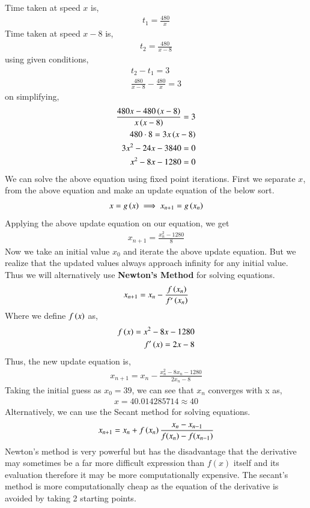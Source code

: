 \documentclass[journal]{IEEEtran}
\begin{document}
Time taken at speed $x$ is,
\begin{align}
    t_1 = \frac{480}{x}
\end{align}
Time taken at speed $x-8$ is,
\begin{align}
    t_2 = \frac{480}{x-8}
\end{align}
using given conditions,
\begin{align}
    t_2 - t_1 = 3\\
    \frac{480}{x-8} - \frac{480}{x} = 3
\end{align}
on simplifying,
\begin{align}
    \frac{480x - 480\left(x-8\right)}{x\left(x-8\right)} = 3\\
    480 \cdot 8 = 3x\left(x-8\right)\\
    3x^2 -24x -3840 = 0\\
    x^2 - 8x -1280 = 0
\end{align}
We can solve the above equation using fixed point iterations. First we separate $x$, from the above equation and make an update equation of the below sort.
\begin{align}
	x = g\left(x\right) \implies x_{n+1} = g\left(x_n\right)
\end{align}
Applying the above update equation on our equation, we get
\begin{align}
	x_{n+1} = 	\frac{x_n^2 - 1280}{8}
\end{align}
Now we take an initial value $x_0$ and iterate the above update equation. But we realize that the updated values always approach infinity for any initial value. \\
Thus we will alternatively use \textbf{Newton's Method} for solving equations.
\begin{align}
	x_{n+1} = x_n - \frac{f\left(x_n\right)}{f^{\prime}\left(x_n\right)} 
\end{align}
Where we define $f\left(x\right)$ as, 
\begin{align}
	f\left(x\right) = x^2-8x-1280 \\
	f^{\prime}\left(x\right) = 2x-8 
\end{align}
Thus, the new update equation is, 
\begin{align}
	x_{n+1} = x_n - \frac{x_n^2-8x_n-1280}{2x_n-8 } 
\end{align}
Taking the initial guess as $x_0 = 39$, we can see that $x_n$ converges with x as,
\begin{align}
	x = 40.014285714 \approx 40
\end{align}
Alternatively, we can use the Secant method for solving equations.
\begin{align}
	x_{n+1} = x_n + f\left(x_n\right)\frac{x_{n} -  x_{n-1}}{f(x_{n}) -  f(x_{n-1})}
\end{align}
Newton's method is very powerful but has the disadvantage that the derivative may sometimes be a far more difficult expression than \(f(x)\) itself and its evaluation therefore it may be more computationally expensive. The secant's method is more computationally cheap as the equation of the derivative is avoided by taking 2 starting points.\\ 
\end{document}
